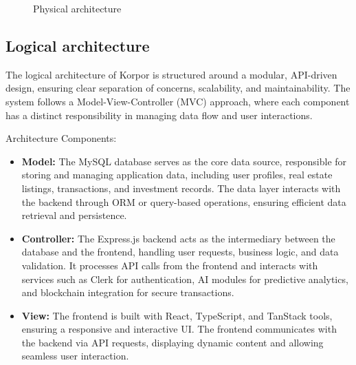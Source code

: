 \begin{figure}[htbp]
    \centering
    \caption{Physical architecture}
    \label{fig:physical-architecture}
\end{figure}

\subsection{Logical architecture}

The logical architecture of Korpor is structured around a modular, API-driven design, ensuring clear separation of concerns, scalability, and maintainability. The system follows a Model-View-Controller (MVC) approach, where each component has a distinct responsibility in managing data flow and user interactions.

Architecture Components:
\begin{itemize}
    \item \textbf{Model:} The MySQL database serves as the core data source, responsible for storing and managing application data, including user profiles, real estate listings, transactions, and investment records. The data layer interacts with the backend through ORM or query-based operations, ensuring efficient data retrieval and persistence.
    
    \item \textbf{Controller:} The Express.js backend acts as the intermediary between the database and the frontend, handling user requests, business logic, and data validation. It processes API calls from the frontend and interacts with services such as Clerk for authentication, AI modules for predictive analytics, and blockchain integration for secure transactions.
    
    \item \textbf{View:} The frontend is built with React, TypeScript, and TanStack tools, ensuring a responsive and interactive UI. The frontend communicates with the backend via API requests, displaying dynamic content and allowing seamless user interaction.
\end{itemize}

